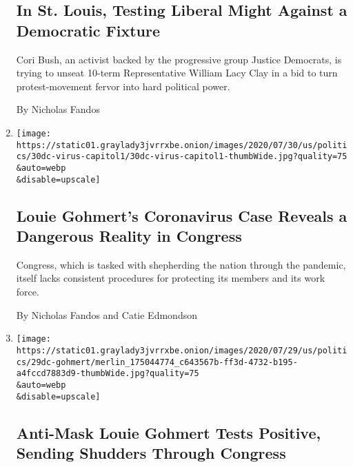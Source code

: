 \begin{enumerate}
  \hypertarget{in-st-louis-testing-liberal-might-against-a-democratic-fixture}{%
  \subsection{In St. Louis, Testing Liberal Might Against a Democratic
  Fixture}\label{in-st-louis-testing-liberal-might-against-a-democratic-fixture}}

  Cori Bush, an activist backed by the progressive group Justice
  Democrats, is trying to unseat 10-term Representative William Lacy
  Clay in a bid to turn protest-movement fervor into hard political
  power.

  By Nicholas Fandos
\item
  \href{/2020/07/30/us/politics/gohmert-coronavirus-congress.html}{}

  \texttt{[image: https://static01.graylady3jvrrxbe.onion/images/2020/07/30/us/politics/30dc-virus-capitol1/30dc-virus-capitol1-thumbWide.jpg?quality=75\\\&auto=webp\\\&disable=upscale]}

  \hypertarget{louie-gohmerts-coronavirus-case-reveals-a-dangerous-reality-in-congress}{%
  \subsection{Louie Gohmert's Coronavirus Case Reveals a Dangerous
  Reality in
  Congress}\label{louie-gohmerts-coronavirus-case-reveals-a-dangerous-reality-in-congress}}

  Congress, which is tasked with shepherding the nation through the
  pandemic, itself lacks consistent procedures for protecting its
  members and its work force.

  By Nicholas Fandos and Catie Edmondson
\item
  \href{/2020/07/29/us/politics/louie-gohmert-positive-coronavirus-mask.html}{}

  \texttt{[image: https://static01.graylady3jvrrxbe.onion/images/2020/07/29/us/politics/29dc-gohmert/merlin\_175044774\_c643567b-ff3d-4732-b195-a4fccd7883d9-thumbWide.jpg?quality=75\\\&auto=webp\\\&disable=upscale]}

  \hypertarget{anti-mask-louie-gohmert-tests-positive-sending-shudders-through-congress}{%
  \subsection{Anti-Mask Louie Gohmert Tests Positive, Sending Shudders
  Through
  Congress}\label{anti-mask-louie-gohmert-tests-positive-sending-shudders-through-congress}}


\end{enumerate}
